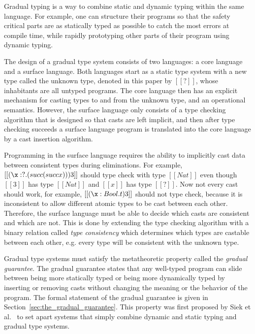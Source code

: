 
Gradual typing \cite{Siek:2006,Siek:2015} is a way to combine static
and dynamic typing within the same language.  For example, one can
structure their programs so that the safety critical parts are as
statically typed as possible to catch the most errors at compile time,
while rapidly prototyping other parts of their program using dynamic
typing.

The design of a gradual type system consists of two languages: a core
language and a surface language.  Both languages start as a static
type system with a new type called the unknown type, denoted in this
paper by $[[?]]$, whose inhabitants are all untyped programs.  The
core language then has an explicit mechanism for casting types to and
from the unknown type, and an operational semantics.  However, the
surface language only consists of a type checking algorithm that is
designed so that casts are left implicit, and then after type checking
succeeds a surface language program is translated into the core
language by a cast insertion algorithm.

Programming in the surface language requires the ability to implicitly
cast data between consistent types during eliminations. For example,
$[[(\x:?.(succ (succ x))) 3]]$ should type check with type $[[Nat]]$
even though $[[3]]$ has type $[[Nat]]$ and $[[x]]$ has type
$[[?]]$. Now not every cast should work, for example, $[[(\x:Bool.t)
    3]]$ should not type check, because it is inconsistent to allow
different atomic types to be cast between each other.  Therefore, the
surface language must be able to decide which casts are consistent and
which are not.  This is done by extending the type checking algorithm
with a binary relation called \emph{type consistency} which determines
which types are castable between each other, e.g. every type will be
consistent with the unknown type.

Gradual type systems must satisfy the metatheoretic property
called the \emph{gradual guarantee}.  The gradual guarantee states
that any well-typed program can slide between being more statically
typed or being more dynamically typed by inserting or removing casts
without changing the meaning or the behavior of the program. The
formal statement of the gradual guarantee is given in
Section~\ref{sec:the_gradual_guarantee}.  This property was first
proposed by Siek et al.~\cite{Siek:2015} to set apart systems that
simply combine dynamic and static typing and gradual type systems.

